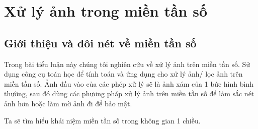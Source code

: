 \documentclass[12pt,a4paper]{report}
\numberwithin{equation}{section}
\theoremstyle{definition} %
\begin{document}
\chapter{\centering Xử lý ảnh trong miền tần số}

\section{Giới thiệu và đôi nét về miền tần số}
Trong bài tiểu luận này chúng tôi nghiên cứu về xử lý ảnh trên miền tần số. Sử dụng công cụ toán học để tính toán và ứng dụng cho xử lý ảnh/ lọc ảnh trên miền tần số. Ảnh đầu vào của các phép xử lý sẽ là ảnh xám của 1 bức hình bình thường, sau đó dùng các phương pháp xử lý ảnh trên miền tần số để làm sắc nét ảnh hơn hoặc làm mờ ảnh đi để 
bảo mật. 


Ta sẽ tìm hiểu khái niệm miền tần số trong không gian 1 chiều.
\end{document}
